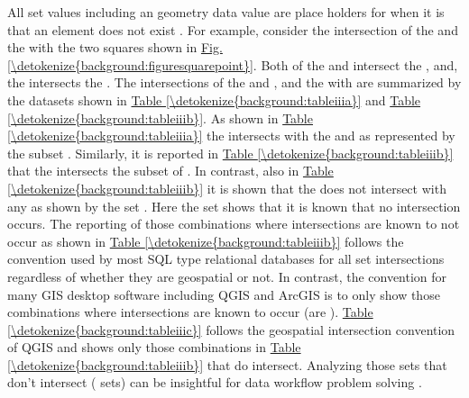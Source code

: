 \documentclass[a4paper,11pt,english]{sphinxmanual}
\begin{document}
All  set values including an  geometry data value are place holders for when it is  that an element does not exist .  For example, consider the intersection  of the  and the  with the two squares shown in \hyperref[\detokenize{background:figuresquarepoint}]{Fig.\@ \ref{\detokenize{background:figuresquarepoint}}}.  Both of the  and  intersect the , and, the  intersects the .  The intersections of the  and , and the  with  are summarized by the datasets shown in \hyperref[\detokenize{background:tableiiia}]{Table \ref{\detokenize{background:tableiiia}}} and \hyperref[\detokenize{background:tableiiib}]{Table \ref{\detokenize{background:tableiiib}}}.  As shown in  \hyperref[\detokenize{background:tableiiia}]{Table \ref{\detokenize{background:tableiiia}}} the  intersects with the   and  as represented by the subset .  Similarly, it is reported in \hyperref[\detokenize{background:tableiiib}]{Table \ref{\detokenize{background:tableiiib}}} that the  intersects the subset of  .  In contrast, also in \hyperref[\detokenize{background:tableiiib}]{Table \ref{\detokenize{background:tableiiib}}} it is shown that the  does not intersect with any  as shown by the  set \sphinxstyleemphasis{\{ \}}.  Here the  set \sphinxstyleemphasis{\{ \}} shows that it is known that no intersection occurs.  The reporting of those combinations where intersections are known to not occur as shown in \hyperref[\detokenize{background:tableiiib}]{Table \ref{\detokenize{background:tableiiib}}} follows the convention used by most SQL type relational databases for all set intersections regardless of whether they are geospatial or not.  In contrast, the convention for many GIS desktop software including QGIS and ArcGIS is to only show those combinations where intersections are known to occur (are ).  \hyperref[\detokenize{background:tableiiic}]{Table \ref{\detokenize{background:tableiiic}}} follows the geospatial intersection convention of QGIS and shows only those combinations in \hyperref[\detokenize{background:tableiiib}]{Table \ref{\detokenize{background:tableiiib}}} that do intersect.  Analyzing those sets that don’t intersect ( sets) can be insightful for data workflow problem solving .
\end{document}
